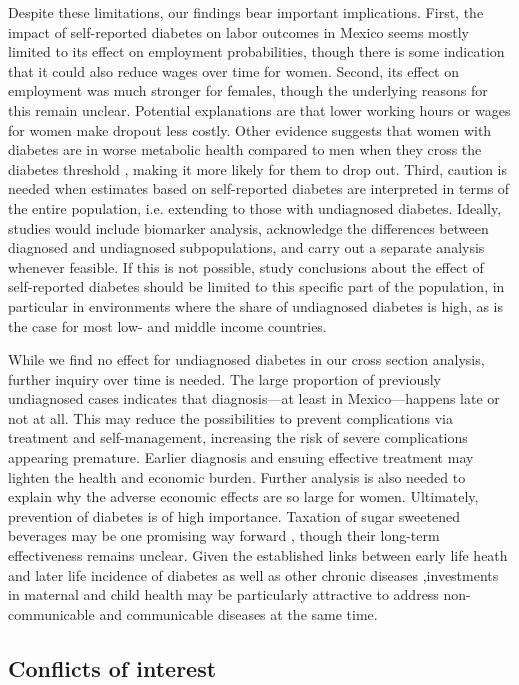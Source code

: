 \documentclass[10pt,letterpaper]{article}
\begin{document}
Despite these limitations, our findings bear important implications. First, the impact of self-reported diabetes on labor outcomes in Mexico seems mostly limited to its effect on employment probabilities, though there is some indication that it could also reduce wages over time for women.  Second, its effect on employment was much stronger for females, though the underlying reasons for this remain unclear. Potential explanations are that lower working hours or wages for women make dropout less costly. Other evidence suggests that women with diabetes are in worse metabolic health compared to men when they cross the diabetes threshold \cite{Peters2015}, making it more likely for them to drop out. Third, caution is needed when estimates based on self-reported diabetes are interpreted in terms of the entire population, i.e. extending to those with undiagnosed diabetes. Ideally, studies would  include biomarker analysis, acknowledge the differences between diagnosed and undiagnosed subpopulations, and carry out a separate analysis whenever feasible. If this is not possible, study conclusions about the effect of self-reported diabetes should be limited to this specific part of the population, in particular in environments where the share of undiagnosed diabetes is high, as is the case for most low- and middle income countries.

While we find no effect for undiagnosed diabetes in our cross section analysis, further inquiry over time is needed. The large proportion of previously undiagnosed cases indicates that diagnosis—at least in Mexico—happens late or not at all. This may reduce the possibilities to prevent complications via treatment and self-management, increasing the risk of severe complications appearing premature. Earlier diagnosis and ensuing effective treatment may lighten the health and economic burden. Further analysis is also needed to explain why the adverse economic effects are so large for women. Ultimately, prevention of diabetes is of high importance. Taxation of sugar sweetened beverages may be one promising way forward \cite{Colchero2016}, though their long-term effectiveness remains unclear. Given the established links between early life heath and later life incidence of diabetes as well as other chronic diseases \cite{Sotomayor2013,Hanson2012,Li2010b},investments in maternal and child health may be particularly attractive to address non-communicable and communicable diseases at the same time.


\subsection*{Conflicts of interest}
\end{document}

